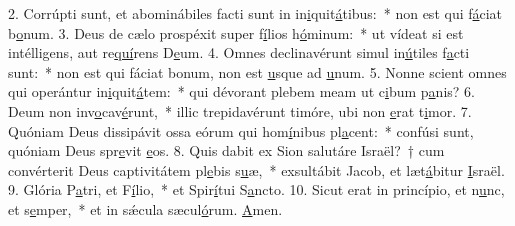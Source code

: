 2. Corrúpti sunt, et abominábiles facti sunt in in\uline{i}quit\uline{á}tibus:~* non est qui f\uline{á}ciat b\uline{o}num.
3. Deus de cælo prospéxit super f\uline{í}lios h\uline{ó}minum:~* ut vídeat si est intélligens, aut re\uline{quí}rens D\uline{e}um.
4. Omnes declinavérunt simul in\uline{ú}tiles f\uline{a}cti sunt:~* non est qui fáciat bonum, non est \uline{u}sque ad \uline{u}num.
5. Nonne scient omnes qui operántur in\uline{i}quit\uline{á}tem:~* qui dévorant plebem meam ut c\uline{i}bum p\uline{a}nis?
6. Deum non inv\uline{o}cav\uline{é}runt,~* illic trepidavérunt timóre, ubi non \uline{e}rat t\uline{i}mor.
7. Quóniam Deus dissipávit ossa eórum qui hom\uline{í}nibus pl\uline{a}cent:~* confúsi sunt, quóniam Deus spr\uline{e}vit \uline{e}os.
8. Quis dabit ex Sion salutáre Israël?~† cum convérterit Deus captivitátem pl\uline{e}bis s\uline{u}æ,~* exsultábit Jacob, et læt\uline{á}bitur \uline{I}sraël.
9. Glória P\uline{a}tri, et F\uline{í}lio,~* et Spir\uline{í}tui S\uline{a}ncto.
10. Sicut erat in princípio, et n\uline{u}nc, et s\uline{e}mper,~* et in sǽcula sæcul\uline{ó}rum. \uline{A}men.
